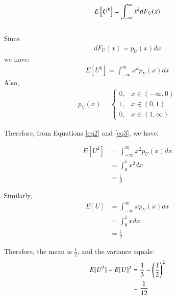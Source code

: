 \documentclass[journal,12pt,twocolumn]{IEEEtran}
\begin{document}
%
\begin{equation}
E{}\left[U^k\right] = \int_{-\infty}^{\infty}x^kdF_{U}(x)
\end{equation}
\\
\solution  Since 
\begin{align}
    dF_U(x) = p_U(x) dx
\end{align}
we have:
\begin{align}
    \label{eq2}
    E[U^k] = \int_{-\infty}^{\infty}x^k p_U(x) dx
\end{align}
Also,
\begin{align}
    \label{eq3}
     p_U(x) = 
    \begin{cases}
        0, & x \in (-\infty,0) \\
        1, & x \in (0,1) \\
        0, & x \in (1, \infty)
    \end{cases}
\end{align}

Therefore, from Equations \ref{eq2} and \ref{eq3}, we have:
    
    \begin{align}
        E[U^2] &=  \int_{-\infty}^{\infty}x^2 p_U(x) dx \\
        &= \int_0 ^1 x^2 dx \\
        &= \frac{1}{3}
    \end{align}
    
    Similarly, 
    \begin{align}
        E[U] &=  \int_{-\infty}^{\infty}x p_U(x) dx \\
        &= \int_0 ^1 x dx \\
        &= \frac{1}{2}
    \end{align}

    Therefore, the mean is $\frac{1}{2}$, and the variance equals:
    \begin{align}
        E[U^2] - E[U]^2 &= \frac{1}{3} - \left(\frac{1}{2}\right)^2 \\
        &= \frac{1}{12}
    \end{align}
\end{document}
